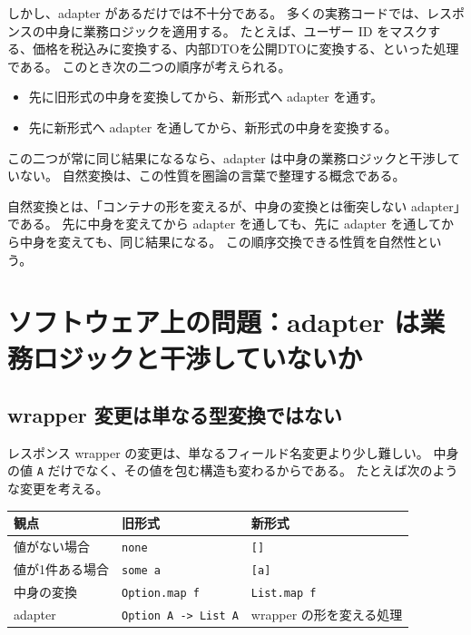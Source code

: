 しかし、adapter があるだけでは不十分である。
多くの実務コードでは、レスポンスの中身に業務ロジックを適用する。
たとえば、ユーザー ID をマスクする、価格を税込みに変換する、内部DTOを公開DTOに変換する、といった処理である。
このとき次の二つの順序が考えられる。

\begin{itemize}
\item 先に旧形式の中身を変換してから、新形式へ adapter を通す。
\item 先に新形式へ adapter を通してから、新形式の中身を変換する。
\end{itemize}

この二つが常に同じ結果になるなら、adapter は中身の業務ロジックと干渉していない。
自然変換は、この性質を圏論の言葉で整理する概念である。

\begin{intuitionbox}
自然変換とは、「コンテナの形を変えるが、中身の変換とは衝突しない adapter」である。
先に中身を変えてから adapter を通しても、先に adapter を通してから中身を変えても、同じ結果になる。
この順序交換できる性質を自然性という。
\end{intuitionbox}


\section{ソフトウェア上の問題：adapter は業務ロジックと干渉していないか}

\subsection{wrapper 変更は単なる型変換ではない}

レスポンス wrapper の変更は、単なるフィールド名変更より少し難しい。
中身の値 \texttt{A} だけでなく、その値を包む構造も変わるからである。
たとえば次のような変更を考える。

\begin{center}
\begin{tabular}{lll}
\toprule
観点 & 旧形式 & 新形式 \\
\midrule
値がない場合 & \texttt{none} & \texttt{[]} \\
値が1件ある場合 & \texttt{some a} & \texttt{[a]} \\
中身の変換 & \texttt{Option.map f} & \texttt{List.map f} \\
adapter & \texttt{Option A -> List A} & wrapper の形を変える処理 \\
\bottomrule
\end{tabular}
\end{center}

